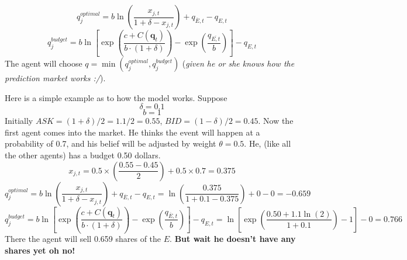 \documentclass{article}
\begin{document}
    \begin{displaymath}
    q_j^{optimal}=b\ln\left({\frac{x_{j,t}}{1+\delta-x_{j,t}}}\right)+q_{\overline{E},t}-q_{E,t}
    \end{displaymath}
    \begin{displaymath}
    q_j^{budget}=b\ln\left[{\exp\left(\frac{c+C(\textbf{q}_t)}{b\cdot (1+\delta)}\right)-\exp\left(\frac{q_{\overline{{E},t}}}{b}\right)}\right]-q_{E,t}
    \end{displaymath}
    The agent will choose $q=\min(q_j^{optimal}, q_j^{budget})$ (\emph{given he or she knows how the prediction market works :/}). 
    
    Here is a simple example as to how the model works. Suppose
    \begin{displaymath}
    \delta = 0.1
    \end{displaymath}
    \begin{displaymath}
    b = 1
    \end{displaymath}
    Initially $ASK=(1+\delta)/2=1.1/2=0.55$, $BID=(1-\delta)/2=0.45$.
    Now the first agent comes into the market. He thinks the event will happen at a probability of 0.7, and his belief will be adjusted by weight $\theta=0.5$. He, (like all the other agents) has a budget 0.50 dollars.
    \begin{displaymath}
    x_{j,t}=0.5\times \left(\frac{0.55-0.45}{2}\right)+0.5\times 0.7=0.375
    \end{displaymath}
    \begin{displaymath}
    q_j^{optimal}=b\ln\left({\frac{x_{j,t}}{1+\delta-x_{j,t}}}\right)+q_{\overline{E},t}-q_{E,t}=\ln\left({\frac{0.375}{1+0.1-0.375}}\right)+0-0=-0.659
    \end{displaymath}
    \begin{displaymath}
    q_j^{budget}=b\ln\left[{\exp\left(\frac{c+C(\textbf{q}_t)}{b\cdot (1+\delta)}\right)-\exp\left(\frac{q_{\overline{{E}},t}}{b}\right)}\right]-q_{E,t}=\ln\left[{\exp\left(\frac{0.50+1.1\ln(2)}{1+0.1}\right)-1}\right]-0=0.766 
    \end{displaymath}
    There the agent will sell 0.659 shares of the $E$. \textbf{But wait he doesn't have any shares yet oh no!}
\end{document}
